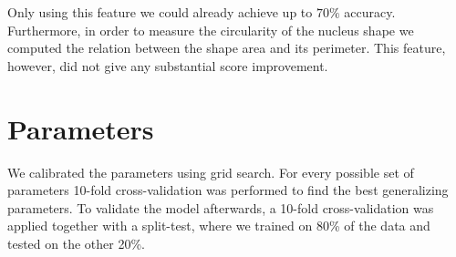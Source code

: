 \documentclass[a4paper, 11pt]{article}
\begin{document}
Only using this feature we could already achieve up to $70\%$ accuracy.\\

Furthermore, in order to measure the circularity of the nucleus shape we computed the relation between the shape area and its perimeter. This feature, however, did not give any substantial score improvement.

\section{Parameters}
We calibrated the parameters using grid search. For every possible set of parameters 10-fold cross-validation was performed to find the best generalizing parameters. To validate the model afterwards, a 10-fold cross-validation was applied together with a split-test, where we trained on 80\% of the data and tested on the other 20\%.
\end{document}

